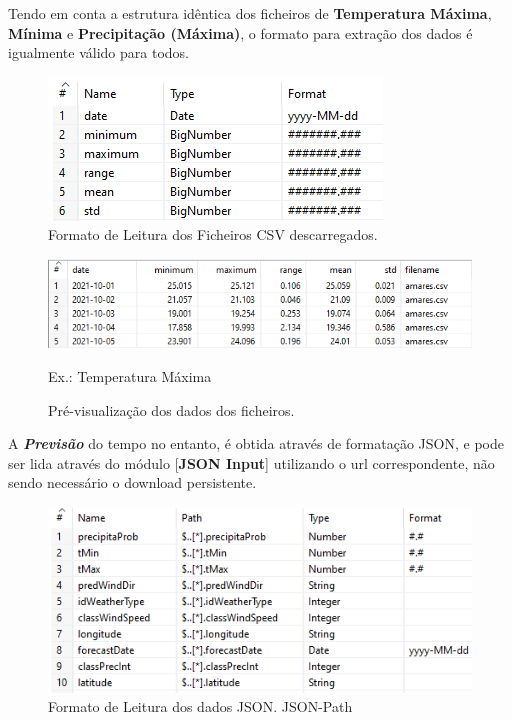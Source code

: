 Tendo em conta a estrutura idêntica dos ficheiros de \textbf{Temperatura Máxima}, \textbf{Mínima} e \textbf{Precipitação (Máxima)}, o formato para extração dos dados é igualmente válido para todos.

\begin{figure}[H]
    \centering
    \includegraphics{imagens-spoon/temp-max-fields.png}
    \caption{Formato de Leitura dos Ficheiros CSV descarregados.}
\end{figure}

\begin{figure}[H]
    \centering
    \includegraphics[scale=0.88]{imagens-spoon/temp-max-preview.png}
    \caption{Pré-visualização dos dados dos ficheiros.} 
    {Ex.: Temperatura Máxima}
\end{figure}

A \textbf{\textit{Previsão}} do tempo no entanto, é obtida através de formatação JSON, e pode ser lida através do módulo [\textbf{JSON Input}] utilizando o url correspondente, não sendo necessário o download persistente.

\begin{figure}[H]
    \centering
    \includegraphics[scale=0.8]{imagens-spoon/previsao-fields.png}
    \caption{Formato de Leitura dos dados JSON. JSON-Path}
\end{figure}


